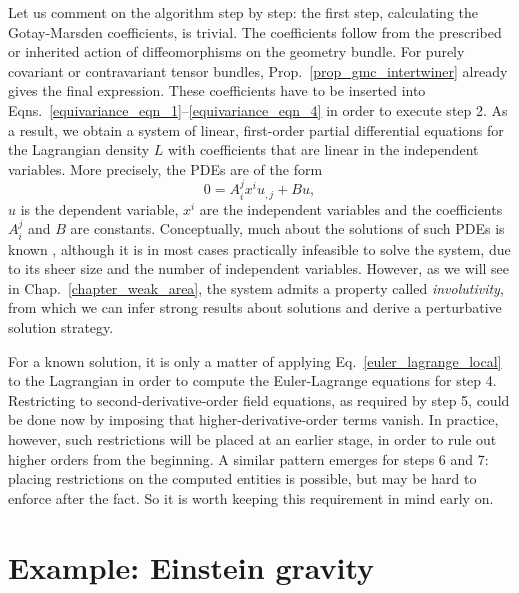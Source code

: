 Let us comment on the algorithm step by step: the first step, calculating the Gotay-Marsden coefficients, is trivial. The coefficients follow from the prescribed or inherited action of diffeomorphisms on the geometry bundle. For purely covariant or contravariant tensor bundles, Prop.~\ref{prop_gmc_intertwiner} already gives the final expression. These coefficients have to be inserted into Eqns.\ \eqref{equivariance_eqn_1}--\eqref{equivariance_eqn_4} in order to execute step 2. As a result, we obtain a system of linear, first-order partial differential equations for the Lagrangian density $L$ with coefficients that are linear in the independent variables. More precisely, the PDEs are of the form
\begin{equation}
  0 = A^j_i x^i u_{,j} + B u,
\end{equation}
$u$ is the dependent variable, $x^i$ are the independent variables and the coefficients $A^j_i$ and $B$ are constants. Conceptually, much about the solutions of such PDEs is known \cite{Seiler_2010}, although it is in most cases practically infeasible to solve the system, due to its sheer size and the number of independent variables. However, as we will see in Chap.~\ref{chapter_weak_area}, the system admits a property called \emph{involutivity}, from which we can infer strong results about solutions and derive a perturbative solution strategy.

For a known solution, it is only a matter of applying Eq.~\ref{euler_lagrange_local} to the Lagrangian in order to compute the Euler-Lagrange equations for step 4. Restricting to second-derivative-order field equations, as required by step 5, could be done now by imposing that higher-derivative-order terms vanish. In practice, however, such restrictions will be placed at an earlier stage, in order to rule out higher orders from the beginning. A similar pattern emerges for steps 6 and 7: placing restrictions on the computed entities is possible, but may be hard to enforce after the fact. So it is worth keeping this requirement in mind early on.

\section{Example: Einstein gravity}

